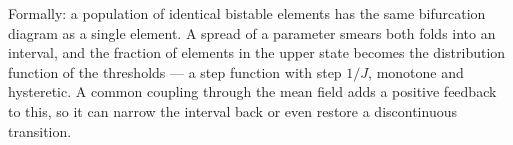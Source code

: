 \begin{ineq}
Formally: a population of identical bistable elements has the same bifurcation diagram as a single element. A spread of a parameter smears both folds into an interval, and the fraction of elements in the upper state becomes the distribution function of the thresholds --- a step function with step $1/J$, monotone and hysteretic. A common coupling through the mean field adds a positive feedback to this, so it can narrow the interval back or even restore a discontinuous transition.
\end{ineq}
